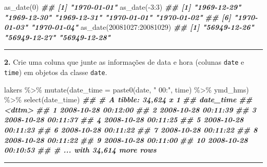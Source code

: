 \documentclass[
]{book}
\newenvironment{Shaded}{\begin{snugshade}}{\end{snugshade}}
\newcommand{\AttributeTok}[1]{\textcolor[rgb]{0.77,0.63,0.00}{#1}}
\newcommand{\DecValTok}[1]{\textcolor[rgb]{0.00,0.00,0.81}{#1}}
\newcommand{\DocumentationTok}[1]{\textcolor[rgb]{0.56,0.35,0.01}{\textbf{\textit{#1}}}}
\newcommand{\FunctionTok}[1]{\textcolor[rgb]{0.00,0.00,0.00}{#1}}
\newcommand{\NormalTok}[1]{#1}
\newcommand{\SpecialCharTok}[1]{\textcolor[rgb]{0.00,0.00,0.00}{#1}}
\newcommand{\StringTok}[1]{\textcolor[rgb]{0.31,0.60,0.02}{#1}}
\begin{document}
\begin{Shaded}
\begin{Highlighting}[]
\FunctionTok{as\_date}\NormalTok{(}\DecValTok{0}\NormalTok{)}
\DocumentationTok{\#\# [1] "1970{-}01{-}01"}
\FunctionTok{as\_date}\NormalTok{(}\SpecialCharTok{{-}}\DecValTok{3}\SpecialCharTok{:}\DecValTok{3}\NormalTok{)}
\DocumentationTok{\#\# [1] "1969{-}12{-}29" "1969{-}12{-}30" "1969{-}12{-}31" "1970{-}01{-}01" "1970{-}01{-}02"}
\DocumentationTok{\#\# [6] "1970{-}01{-}03" "1970{-}01{-}04"}
\FunctionTok{as\_date}\NormalTok{(}\DecValTok{20081027}\SpecialCharTok{:}\DecValTok{20081029}\NormalTok{)}
\DocumentationTok{\#\# [1] "56949{-}12{-}26" "56949{-}12{-}27" "56949{-}12{-}28"}
\end{Highlighting}
\end{Shaded}

\begin{center}\rule{0.5\linewidth}{0.5pt}\end{center}

\textbf{2.} Crie uma coluna que junte as informações de data e hora (colunas \texttt{date} e \texttt{time}) em objetos da classe \texttt{date}.

\begin{Shaded}
\begin{Highlighting}[]
\NormalTok{lakers }\SpecialCharTok{\%\textgreater{}\%} 
  \FunctionTok{mutate}\NormalTok{(}\AttributeTok{date\_time =} \FunctionTok{paste0}\NormalTok{(date, }\StringTok{" 00:"}\NormalTok{, time) }\SpecialCharTok{\%\textgreater{}\%}\NormalTok{ ymd\_hms) }\SpecialCharTok{\%\textgreater{}\%} 
  \FunctionTok{select}\NormalTok{(date\_time)}
\DocumentationTok{\#\# \# A tibble: 34,624 x 1}
\DocumentationTok{\#\#    date\_time          }
\DocumentationTok{\#\#    \textless{}dttm\textgreater{}             }
\DocumentationTok{\#\#  1 2008{-}10{-}28 00:12:00}
\DocumentationTok{\#\#  2 2008{-}10{-}28 00:11:39}
\DocumentationTok{\#\#  3 2008{-}10{-}28 00:11:37}
\DocumentationTok{\#\#  4 2008{-}10{-}28 00:11:25}
\DocumentationTok{\#\#  5 2008{-}10{-}28 00:11:23}
\DocumentationTok{\#\#  6 2008{-}10{-}28 00:11:22}
\DocumentationTok{\#\#  7 2008{-}10{-}28 00:11:22}
\DocumentationTok{\#\#  8 2008{-}10{-}28 00:11:22}
\DocumentationTok{\#\#  9 2008{-}10{-}28 00:11:00}
\DocumentationTok{\#\# 10 2008{-}10{-}28 00:10:53}
\DocumentationTok{\#\# \# ... with 34,614 more rows}
\end{Highlighting}
\end{Shaded}

\begin{center}\rule{0.5\linewidth}{0.5pt}\end{center}
\end{document}
